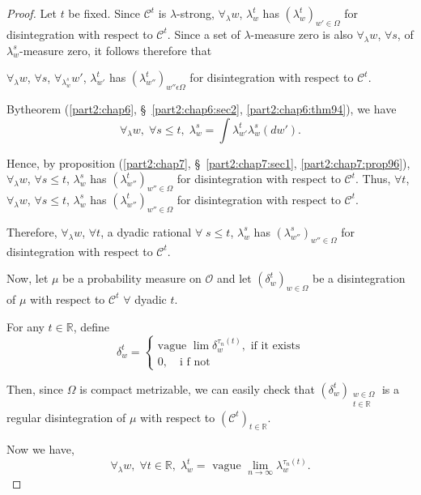 \begin{proof}
Let $t$ be fixed. Since $\mathscr{C}^t$ is $\lambda$-strong,
$\forall_\lambda w$, $\lambda^t_w$ has $(\lambda^t_w)_{w' \in \Omega}$
for disintegration with respect to $\mathscr{C}^t$. Since a set of
$\lambda$-measure zero is also $\forall_\lambda w$, $\forall s$, of
$\lambda^s_w$-measure zero, it follows therefore that 

$\forall_\lambda w$, $\forall s$, $\forall_{\lambda^s_w} w'$,
$\lambda^t_{w'}$ has $(\lambda^t_{w''})_{w''\epsilon \Omega}$ for
disintegration with respect to $\mathscr{C}^t$. 

By\pageoriginale theorem (\ref{part2:chap6},
\S\ \ref{part2:chap6:sec2}, \ref{part2:chap6:thm94}), we have 
$$
\forall_\lambda w, \; \forall s \leq t, \; \lambda^s_w = \int
\lambda^t_{w'} \lambda^s_w(dw'). 
$$

Hence, by proposition (\ref{part2:chap7}, \S\ \ref{part2:chap7:sec1},
\ref{part2:chap7:prop96}), $\forall_\lambda w$, $\forall 
s \leq t$, $\lambda^s_w$ has $(\lambda^t_{w''})_{w'' \in \Omega}$ for
disintegration with respect to $\mathscr{C}^t$. Thus, $\forall t$,
$\forall_\lambda w$, $\forall s \leq t$, $\lambda^s_w$ has
$(\lambda^t_{w''})_{w'' \in \Omega}$ for disintegration with respect
to $\mathscr{C}^t$.

Therefore, $\forall_\lambda w$, $\forall t$, a dyadic rational
$\forall \; s \leq t$, $\lambda^s_w$ has $(\lambda^s_{w''})_{w'' \in
  \Omega}$ for disintegration with respect to $\mathscr{C}^t$. 

Now, let $\mu$ be a probability measure on $\mathscr{O}$ and let
$(\delta^t_w)_{w \in \Omega}$ be a disintegration of $\mu$ with
respect to $\mathscr{C}^t$ $\forall$ dyadic $t$. 

For any $t \in \mathbb{R}$, define
$$
\delta^t_w =
 \begin{cases}
\text{vague } \lim \delta^{\tau_n(t)}_w, \text{ if it exists}\\
0, \quad \text{i f not}
 \end{cases}
$$

Then, since $\Omega$ is compact metrizable, we can easily check that\break
$(\delta^t_w)_{\substack{w \in \Omega\\ t \in \mathbb{R}}}$  is a
regular disintegration of $\mu$ with respect to $(\mathscr{C}^t)_{t
  \in \mathbb{R}}$.

Now we have,
$$
\forall_\lambda w, \; \forall t \in \mathbb{R}, \; \lambda^t_w =
\text{ vague } \lim\limits_{n \to \infty} \lambda^{\tau_n (t)}_w. 
$$


\end{proof}
